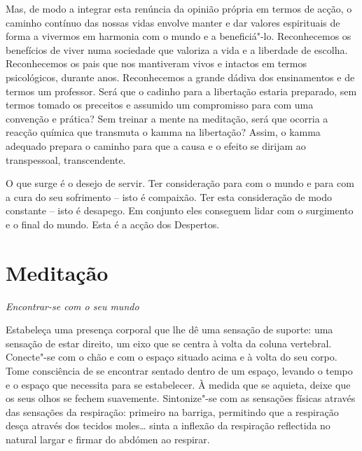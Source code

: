Mas, de modo a integrar esta renúncia da opinião própria em termos de acção, o
caminho contínuo das nossas vidas envolve manter e dar valores espirituais de
forma a vivermos em harmonia com o mundo e a beneficiá"-lo. Reconhecemos os
benefícios de viver numa sociedade que valoriza a vida e a liberdade de escolha.
Reconhecemos os pais que nos mantiveram vivos e intactos em termos psicológicos,
durante anos. Reconhecemos a grande dádiva dos ensinamentos e de termos um
professor. Será que o cadinho para a libertação estaria preparado, sem termos
tomado os preceitos e assumido um compromisso para com uma convenção e prática?
Sem treinar a mente na meditação, será que ocorria a reacção química que
transmuta o kamma na libertação? Assim, o kamma adequado prepara o caminho para
que a causa e o efeito se dirijam ao transpessoal, transcendente.

O que surge é o desejo de servir. Ter consideração para com o mundo e para com a
cura do seu sofrimento -- isto é compaixão. Ter esta consideração de modo
constante -- isto é desapego. Em conjunto eles conseguem lidar com o surgimento
e o final do mundo. Esta é a acção dos Despertos.

\clearpage

\section[Meditação: encontrar-se com o seu mundo]{Meditação}

{\centering
\subSectionFont\selectfont
\textit{Encontrar-se com o seu mundo}
\par}

\bigskip

Estabeleça uma presença corporal que lhe dê uma sensação de suporte: uma
sensação de estar direito, um eixo que se centra à volta da coluna vertebral.
Conecte"-se com o chão e com o espaço situado acima e à volta do seu corpo. Tome
consciência de se encontrar sentado dentro de um espaço, levando o tempo e o
espaço que necessita para se estabelecer. À medida que se aquieta, deixe que os
seus olhos se fechem suavemente. Sintonize"-se com as sensações físicas através
das sensações da respiração: primeiro na barriga, permitindo que a respiração
desça através dos tecidos moles\ldots{} sinta a inflexão da respiração
reflectida no natural largar e firmar do abdómen ao respirar.

